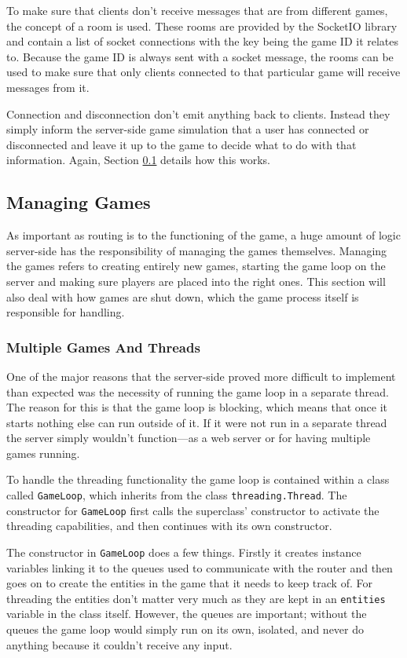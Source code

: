To make sure that clients don't receive messages that are from different games, the concept of a room is used. These rooms are provided by the SocketIO library and contain a list of socket connections with the key being the game ID it relates to. Because the game ID is always sent with a socket message, the rooms can be used to make sure that only clients connected to that particular game will receive messages from it.

Connection and disconnection don't emit anything back to clients. Instead they simply inform the server-side game simulation that a user has connected or disconnected and leave it up to the game to decide what to do with that information. Again, Section \ref{managing_games} details how this works.

\subsection{Managing Games}\label{managing_games}
As important as routing is to the functioning of the game, a huge amount of logic server-side has the responsibility of managing the games themselves. Managing the games refers to creating entirely new games, starting the game loop on the server and making sure players are placed into the right ones. This section will also deal with how games are shut down, which the game process itself is responsible for handling.

\subsubsection{Multiple Games And Threads}
One of the major reasons that the server-side proved more difficult to implement than expected was the necessity of running the game loop in a separate thread. The reason for this is that the game loop is blocking, which means that once it starts nothing else can run outside of it. If it were not run in a separate thread the server simply wouldn't function---as a web server or for having multiple games running.

To handle the threading functionality the game loop is contained within a class called \texttt{GameLoop}, which inherits from the class \texttt{threading.Thread}. The constructor for \texttt{GameLoop} first calls the superclass' constructor to activate the threading capabilities, and then continues with its own constructor.

The constructor in \texttt{GameLoop} does a few things. Firstly it creates instance variables linking it to the queues used to communicate with the router and then goes on to create the entities in the game that it needs to keep track of. For threading the entities don't matter very much as they are kept in an \texttt{entities} variable in the class itself. However, the queues are important; without the queues the game loop would simply run on its own, isolated, and never do anything because it couldn't receive any input.

